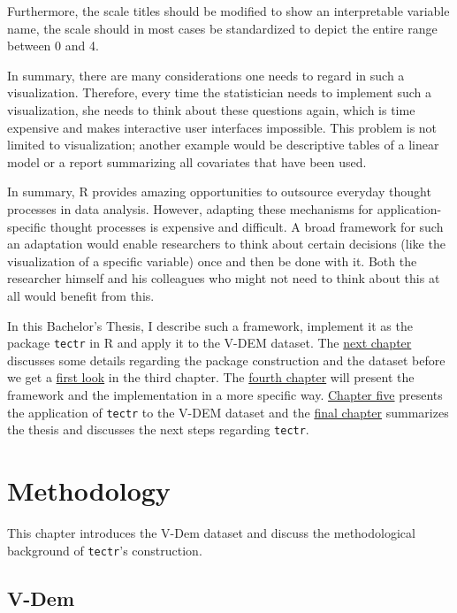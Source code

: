 \documentclass[]{report}
\theoremstyle{definition}
\theoremstyle{definition}
\theoremstyle{definition}
\theoremstyle{remark}
\begin{document}
Furthermore, the scale titles should be modified to show an
interpretable variable name, the scale should in most cases be
standardized to depict the entire range between 0 and 4.

In summary, there are many considerations one needs to regard in such a
visualization. Therefore, every time the statistician needs to implement
such a visualization, she needs to think about these questions again,
which is time expensive and makes interactive user interfaces
impossible. This problem is not limited to visualization; another
example would be descriptive tables of a linear model or a report
summarizing all covariates that have been used.

In summary, R provides amazing opportunities to outsource everyday
thought processes in data analysis. However, adapting these mechanisms
for application-specific thought processes is expensive and difficult. A
broad framework for such an adaptation would enable researchers to think
about certain decisions (like the visualization of a specific variable)
once and then be done with it. Both the researcher himself and his
colleagues who might not need to think about this at all would benefit
from this.

In this Bachelor's Thesis, I describe such a framework, implement it as
the package \texttt{tectr} in R and apply it to the V-DEM dataset. The
\protect\hyperlink{methods}{next chapter} discusses some details
regarding the package construction and the dataset before we get a
\protect\hyperlink{example}{first look} in the third chapter. The
\protect\hyperlink{concept}{fourth chapter} will present the framework
and the implementation in a more specific way.
\protect\hyperlink{application}{Chapter five} presents the application
of \texttt{tectr} to the V-DEM dataset and the
\protect\hyperlink{summary}{final chapter} summarizes the thesis and
discusses the next steps regarding \texttt{tectr}.

\hypertarget{methods}{\chapter{Methodology}\label{methods}}

This chapter introduces the V-Dem dataset and discuss the methodological
background of \texttt{tectr}'s construction.

\section{V-Dem}\label{v-dem}
\end{document}
